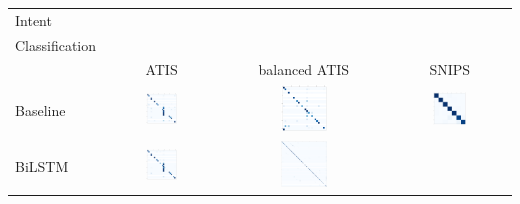 \documentclass[a4paper]{article}
\begin{document}
\begin{table}[h!]
	\centering
	\begin{adjustbox}{max width=\textwidth}
		\begin{tabular}{l|ccc}
			Intent & & & \\
			Classification & & & \\
			& ATIS & balanced ATIS & SNIPS \\
			\cmidrule{1-4}
			Baseline &  \includegraphics[width=0.3\textwidth]{"../assets/images/confusion matrixes/CM_baseline_intent_ATIS_labeless"} & \includegraphics[width=0.3\textwidth]{"../assets/images/confusion matrixes/CM_baseline_intent_remix_ATIS_labeless"} &\includegraphics[width=0.3\textwidth]{"../assets/images/confusion matrixes/CM_baseline_intent_SNIPS_labeless"} \\
			\cmidrule{1-4}
			BiLSTM &  \includegraphics[width=0.3\textwidth]{"../assets/images/confusion matrixes/CM_BiLSTM_intent_ATIS_labeless.png"} & \includegraphics[width=0.3\textwidth]{"../assets/images/confusion matrixes/CM_BiLSTM_slot_remix_ATIS_labeless"}

\end{tabular}
\end{adjustbox}
\end{table}
\end{document}
